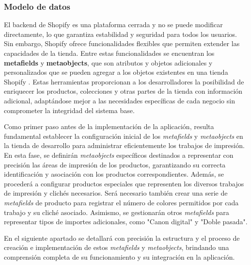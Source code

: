 \documentclass[11pt]{article}
\begin{document}
\subsubsection{Modelo de datos}
El backend de Shopify es una plataforma cerrada y no se puede modificar directamente, lo que garantiza estabilidad y 
seguridad para todos los usuarios. Sin embargo, Shopify ofrece funcionalidades flexibles que permiten extender las 
capacidades de la tienda. Entre estas funcionalidades se encuentran los \textbf{metafields} y \textbf{metaobjects}, 
que son atributos y objetos adicionales y personalizados que se pueden agregar a los objetos existentes en una tienda Shopify \cite{metadatos}. 
Estas herramientas proporcionan a los desarrolladores la posibilidad de enriquecer los productos, 
colecciones y otras partes de la tienda con información adicional, adaptándose mejor a las necesidades 
específicas de cada negocio sin comprometer la integridad del sistema base.

Como primer paso antes de la implementación de la aplicación, resulta fundamental establecer la configuración inicial 
de los \textit{metafields} y \textit{metaobjects} en la tienda de desarrollo para administrar eficientemente los trabajos 
de impresión. En esta fase, se definirán \textit{metaobjects} específicos destinados a representar con precisión las áreas 
de impresión de los productos, garantizando su correcta identificación y asociación con los productos correspondientes. 
Además, se procederá a configurar productos especiales que representen los diversos trabajos de impresión y clichés necesarios. 
Será necesario también crear una serie de \textit{metafields} de producto para registrar el número de colores permitidos por 
cada trabajo y su cliché asociado. Asimismo, se gestionarán otros \textit{metafields} para representar tipos de importes adicionales, 
como "Canon digital" y "Doble pasada".

En el siguiente apartado se detallará con precisión la estructura y el proceso de creación e implementación de estos \textit{metafields} y \textit{metaobjects}, brindando 
una comprensión completa de su funcionamiento y su integración en la aplicación.

\clearpage
\end{document}
